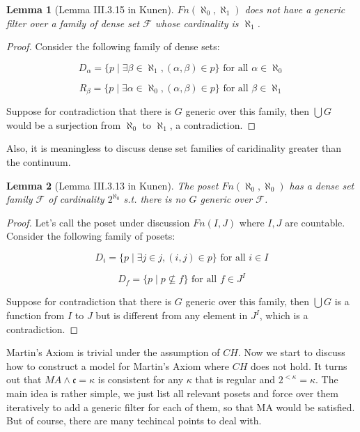 \documentclass{article}
\newtheorem{lemma}{Lemma}
\begin{document}
\begin{lemma}[Lemma III.3.15 in Kunen]
    $Fn(\aleph_0,\aleph_1)$ does not have a generic filter over 
    a family of dense set $\mathcal{F}$ whose cardinality is $\aleph_1$.
\end{lemma}

\begin{proof}
    Consider the following family of dense sets:

    $$D_\alpha = \{p\mid \exists \beta\in \aleph_1, (\alpha,\beta)\in p\} \text{ for all }\alpha\in \aleph_0$$

    $$R_\beta = \{p\mid \exists \alpha\in \aleph_0, (\alpha,\beta)\in p\} \text{ for all }\beta\in \aleph_1$$

    Suppose for contradiction that there is $G$ generic over this family, then $\bigcup G$ would be a surjection from $\aleph_0$ to $\aleph_1$, a contradiction.
\end{proof}

Also, it is meaningless to discuss dense set families of caridinality greater than the continuum.

\begin{lemma}[Lemma III.3.13 in Kunen]
    The poset $Fn(\aleph_0,\aleph_0)$ has a dense set family $\mathcal{F}$ of cardinality $2^{\aleph_0}$ s.t. there is no $G$ generic over $\mathcal{F}$.
\end{lemma}

\begin{proof}
    Let's call the poset under discussion $Fn(I,J)$ where $I,J$ are countable. Consider the following family of posets:

    $$D_i = \{p\mid \exists j\in j, (i,j)\in p\} \text{ for all }i\in I$$

    $$D_f = \{p\mid p\not \subseteq f\} \text{ for all }f\in J^I$$

    Suppose for contradiction that there is $G$ generic over this family, then $\bigcup G$ is a function from $I$ to $J$ but is different from any element in $J^I$, which is a contradiction.
\end{proof}

Martin's Axiom is trivial under the assumption of $CH$. Now we start to discuss how to construct a model for Martin's Axiom where $CH$ does not hold. It turns out that $MA \land \mathfrak{c} = \kappa$ is consistent for any $\kappa$ that is regular and $2^{<\kappa} = \kappa$. The main idea is rather simple, we just list all relevant posets and force over them iteratively to add a generic filter for each of them, so that MA would be satisfied. But of course, there are many techincal points to deal with.
\end{document}
